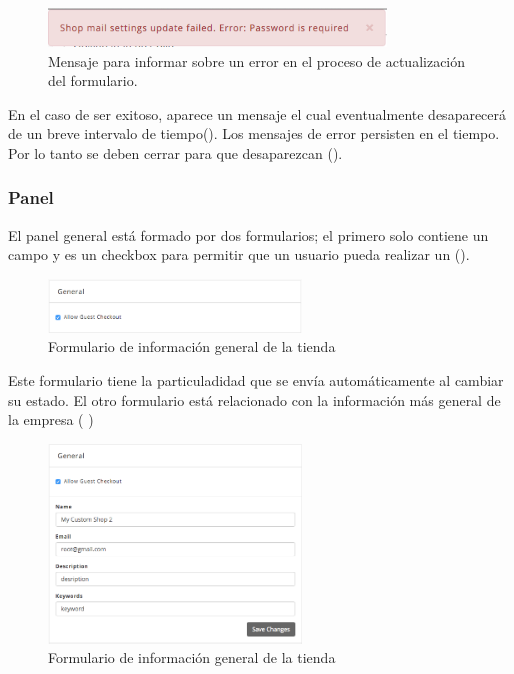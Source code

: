 \begin{figure}[H]
	\centering
	\includegraphics[width=0.8\textwidth]{figuras/dashboard/ecommerce/error_message.png}
	\caption{Mensaje para informar sobre un error en el proceso de actualización del formulario.}
	\label{figure:dashboard:ecommerce:error_message}
\end{figure}

En el caso de ser exitoso, aparece un mensaje el cual eventualmente desaparecerá de un breve intervalo de tiempo(). Los mensajes de error persisten en el tiempo. Por lo tanto se deben cerrar para que desaparezcan ().


\subsubsection*{Panel \generalPanel}

El panel general está formado por dos formularios; el primero solo contiene un campo y es un checkbox para permitir que un usuario \userGuestAccount pueda realizar un \checkoutCOM ().

\begin{figure}[H]
	\centering
	\includegraphics[width=0.6\textwidth]{figuras/dashboard/ecommerce/general_menu/allow_checkout.png}
	\caption{Formulario de información general de la tienda}
	\label{figure:dashboard:ecommerce:general_menu:allow_checkout}
\end{figure}

Este formulario tiene la particuladidad que se envía automáticamente al cambiar su estado.
El otro formulario está relacionado con la información más general de la empresa ( )

\begin{figure}[H]
	\centering
	\includegraphics[width=0.6\textwidth]{figuras/dashboard/ecommerce/general_menu/menu.png}
	\caption{Formulario de información general de la tienda}
	\label{figure:dashboard:ecommerce:general_menu:menu}
\end{figure}

